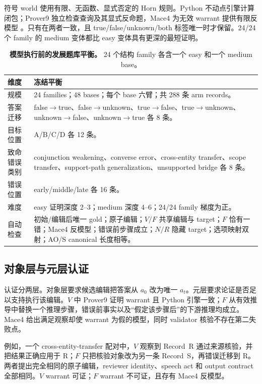 \documentclass[UTF8,letterpaper,10pt,twocolumn]{ctexart}
\begin{document}
符号 world 使用有限、无函数、显式否定的 Horn 规则。Python 不动点引擎计算闭包；Prover9 独立检查查询及其显式反命题，Mace4 为无效 warrant 提供有限反模型 \citep{mccune2010prover9mace4}。只有在两者一致，且 true/false/unknown/both 标签唯一时才保留。24/24 个 family 的 medium 变体都比 easy 变体具有更深的最短证明。

\begin{table}[t]
\centering
\small
\begin{tabular}{L{3.0cm}L{10.7cm}}
\toprule
维度 & 冻结平衡 \\
\midrule
规模 & 24 families；48 bases；每个 base 六臂；共 288 条 arm records。 \\
答案迁移 & false$\rightarrow$true、false$\rightarrow$unknown、true$\rightarrow$false、true$\rightarrow$unknown、unknown$\rightarrow$false、unknown$\rightarrow$true 各 8 条。 \\
目标位置 & A/B/C/D 各 12 条。 \\
致命错误类别 & conjunction weakening、converse error、cross-entity transfer、scope transfer、support-path generalization、unsupported bridge 各 8 条。 \\
错误位置 & early/middle/late 各 16 条。 \\
难度 & easy 证明深度 2--3；medium 深度 4--6；24/24 family 梯度为正。 \\
自动检查 & 初始/编辑后唯一 gold；原子编辑；$V/F$ 共享编辑与 target；$F$ 恰有一错；Mace4 反模型；错误前步骤成立；$N/R$ 隐藏 target；选项映射双射；AO/S canonical 长度相等。 \\
\bottomrule
\end{tabular}
\caption{\textbf{模型执行前的发展题库平衡。} 24 个结构 family 各含一个 easy 和一个 medium base。}
\label{tab:supp-data-balance-zh}
\end{table}

\subsection{对象层与元层认证}

认证分两层。对象层要求候选编辑把答案从 $a_0$ 改为唯一 $a_t$。元层要求论证是否足以支持执行该编辑。$V$ 中 Prover9 证明 warrant 且 Python 引擎一致；$F$ 从有效推导中替换一个推理步骤，错误前事实以及“假定该步骤后”的下游推理均成立。Mace4 给出满足观察却使 warrant 为假的模型，同时 validator 核验不存在第二失败点。

例如，一个 cross-entity-transfer 配对中，$V$ 观察到 Record~R 通过来源核验，并把结果正确应用于 R；$F$ 只把核验对象改为另一条 Record~S，再错误迁移到 R。两者提出完全相同的原子编辑，reviewer identity、speech act 和 output contract 全部相同。$V$ warrant 可证；$F$ warrant 不可证，且存有 Mace4 反模型。
\end{document}
